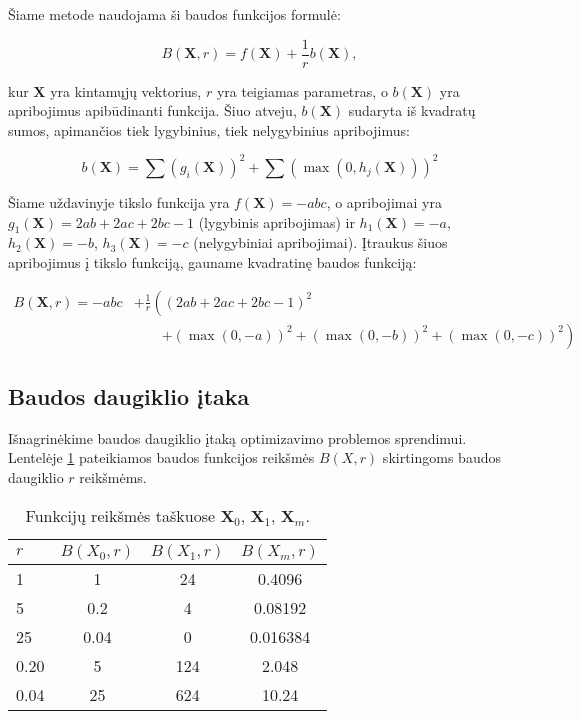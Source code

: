 \documentclass[a4paper,12pt,fleqn]{article}
\begin{document}
Šiame metode naudojama ši baudos funkcijos formulė:

\begin{equation}
B(\mathbf{X}, r) = f(\mathbf{X}) + \frac{1}{r} b(\mathbf{X}),
\end{equation}

kur $\mathbf{X}$ yra kintamųjų vektorius, $r$ yra teigiamas parametras, o $b(\mathbf{X})$ yra apribojimus apibūdinanti funkcija. Šiuo atveju, $b(\mathbf{X})$ sudaryta iš kvadratų sumos, apimančios tiek lygybinius, tiek nelygybinius apribojimus:

\begin{equation}
b(\mathbf{X}) = \sum (g_i(\mathbf{X}))^2 + \sum (\max(0, h_j(\mathbf{X})))^2
\end{equation}

Šiame uždavinyje tikslo funkcija yra $f(\mathbf{X}) = -abc$, o apribojimai yra $g_1(\mathbf{X}) = 2ab + 2ac + 2bc - 1$ (lygybinis apribojimas) ir $h_1(\mathbf{X}) = -a$, $h_2(\mathbf{X}) = -b$, $h_3(\mathbf{X}) = -c$ (nelygybiniai apribojimai). Įtraukus šiuos apribojimus į tikslo funkciją, gauname kvadratinę baudos funkciją:

\begin{equation}
\begin{split}
B(\mathbf{X}, r) = -abc &+ \frac{1}{r}\left( (2ab + 2ac + 2bc - 1)^2 \right. \\
&\qquad \left. + (\max(0, -a))^2 + (\max(0, -b))^2 + (\max(0, -c))^2 \right)
\end{split}
\end{equation}

\pagebreak
\subsection{Baudos daugiklio įtaka}

Išnagrinėkime baudos daugiklio įtaką optimizavimo problemos sprendimui.
Lentelėje \ref{table:rchange} pateikiamos baudos funkcijos reikšmės $B(X, r)$ skirtingoms baudos daugiklio $r$ reikšmėms.

\begin{table}[H]
\centering
\caption{Funkcijų reikšmės taškuose $\mathbf{X}_0$, $\mathbf{X}_1$, $\mathbf{X}_m$.}
\def\arraystretch{1.2}
\setlength{\tabcolsep}{0.8em}
\begin{tabular}{l c c c}
\hline\hline
$r$ & $B(X_0, r)$ & $B(X_1, r)$ & $B(X_m, r)$ \\ [0.5ex]
\hline
1 & 1 & 24 & 0.4096 \\
5 & 0.2 & 4 & 0.08192 \\
25 & 0.04 & 0 & 0.016384 \\
0.20 & 5 & 124 & 2.048 \\
0.04 & 25 & 624 & 10.24 \\
\hline
\end{tabular}
\label{table:rchange}
\end{table}
\end{document}
